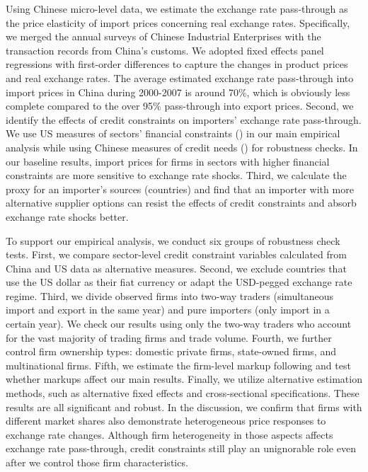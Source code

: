 Using Chinese micro-level data, we estimate the exchange rate pass-through as the price elasticity of import prices concerning real exchange rates. Specifically, we merged the annual surveys of Chinese Industrial Enterprises with the transaction records from China’s customs. We adopted fixed effects panel regressions with first-order differences to capture the changes in product prices and real exchange rates. The average estimated exchange rate pass-through into import prices in China during 2000-2007 is around 70\%, which is obviously less complete compared to the over 95\% pass-through into export prices. Second, we identify the effects of credit constraints on importers' exchange rate pass-through. We use US measures of sectors’ financial constraints (\cite{manova-wei-zhang2015}) in our main empirical analysis while using Chinese measures of credit needs (\cite{fan-li-yeaple2015}) for robustness checks. In our baseline results, import prices for firms in sectors with higher financial constraints are more sensitive to exchange rate shocks. Third, we calculate the proxy for an importer's sources (countries) and find that an importer with more alternative supplier options can resist the effects of credit constraints and absorb exchange rate shocks better.

To support our empirical analysis, we conduct six groups of robustness check tests. First, we compare sector-level credit constraint variables calculated from China and US data as alternative measures. Second, we exclude countries that use the US dollar as their fiat currency or adapt the USD-pegged exchange rate regime. Third, we divide observed firms into two-way traders (simultaneous import and export in the same year) and pure importers (only import in a certain year). We check our results using only the two-way traders who account for the vast majority of trading firms and trade volume. Fourth, we further control firm ownership types: domestic private firms, state-owned firms, and multinational firms. Fifth, we estimate the firm-level markup following \cite{dlw2012} and test whether markups affect our main results. Finally, we utilize alternative estimation methods, such as alternative fixed effects and cross-sectional specifications. These results are all significant and robust. In the discussion, we confirm that firms with different market shares also demonstrate heterogeneous price responses to exchange rate changes. Although firm heterogeneity in those aspects affects exchange rate pass-through, credit constraints still play an unignorable role even after we control those firm characteristics. 

